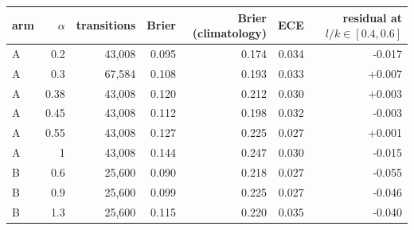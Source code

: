 \begin{tabular}{lrrrrrr}
\toprule
arm & $\alpha$ & transitions & Brier & Brier (climatology) & ECE & residual at $l/k\in[0.4,0.6]$ \\
\midrule
A & 0.2 & 43,008 & 0.095 & 0.174 & 0.034 & -0.017 \\
A & 0.3 & 67,584 & 0.108 & 0.193 & 0.033 & +0.007 \\
A & 0.38 & 43,008 & 0.120 & 0.212 & 0.030 & +0.003 \\
A & 0.45 & 43,008 & 0.112 & 0.198 & 0.032 & -0.003 \\
A & 0.55 & 43,008 & 0.127 & 0.225 & 0.027 & +0.001 \\
A & 1 & 43,008 & 0.144 & 0.247 & 0.030 & -0.015 \\
B & 0.6 & 25,600 & 0.090 & 0.218 & 0.027 & -0.055 \\
B & 0.9 & 25,600 & 0.099 & 0.225 & 0.027 & -0.046 \\
B & 1.3 & 25,600 & 0.115 & 0.220 & 0.035 & -0.040 \\
\bottomrule
\end{tabular}
